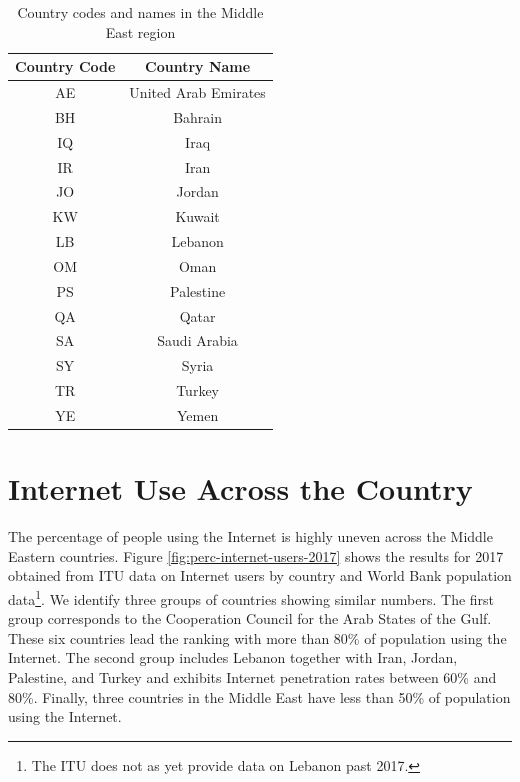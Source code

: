 \documentclass[a4paper,titlepage]{article}
\begin{document}
\begin{table}[h!]
\centering
    \begin{tabular}{ | c | c | } 
    \hline
     \rowcolor{astral} Country Code & Country Name \\
     \hline
     \hline
     AE & United Arab Emirates \\ 
     BH & Bahrain \\
     IQ & Iraq \\
     IR & Iran \\
     JO & Jordan \\
     KW & Kuwait \\
     LB & Lebanon \\
     OM & Oman \\
     PS & Palestine \\
     QA & Qatar \\
     SA & Saudi Arabia \\
     SY & Syria \\
     TR & Turkey \\
     YE & Yemen\\
    \hline
    \end{tabular}
    \caption{Country codes and names in the Middle East region}
    \label{table:1} 
\end{table}

\section{Internet Use Across the Country}
The percentage of people using the Internet is highly uneven across the Middle Eastern countries. Figure \ref{fig:perc-internet-users-2017} shows the results for 2017 obtained from ITU data on Internet users by country and World Bank population data\footnote{The ITU does not as yet provide data on Lebanon past 2017.}. We identify three groups of countries showing similar numbers. The first group corresponds to the Cooperation Council for the Arab States of the Gulf. These six countries lead the ranking with more than 80\% of population using the Internet. The second group includes Lebanon together with Iran, Jordan, Palestine, and Turkey and exhibits Internet penetration rates between 60\% and 80\%. Finally, three countries in the Middle East have less than 50\% of population using the Internet.
\end{document}
